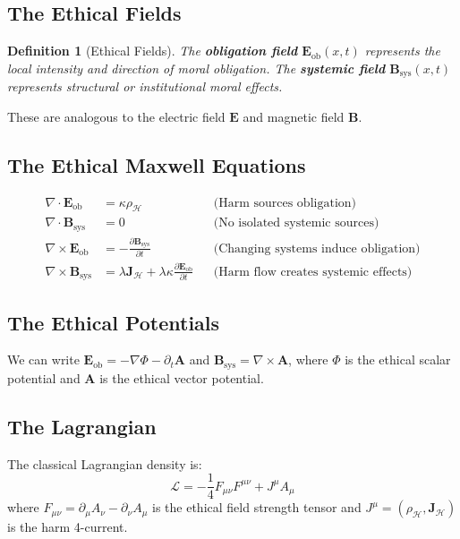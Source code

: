 \documentclass[12pt]{article}
\newtheorem{definition}{Definition}[section]
\begin{document}
\subsection{The Ethical Fields}

\begin{definition}[Ethical Fields]
The \textbf{obligation field} $\mathbf{E}_{\mathrm{ob}}(x,t)$ represents the local intensity and direction of moral obligation. The \textbf{systemic field} $\mathbf{B}_{\mathrm{sys}}(x,t)$ represents structural or institutional moral effects.
\end{definition}

These are analogous to the electric field $\mathbf{E}$ and magnetic field $\mathbf{B}$.

\subsection{The Ethical Maxwell Equations}

\begin{align}
    \nabla \cdot \mathbf{E}_{\mathrm{ob}} &= \kappa \rho_{\mathcal{H}} & &\text{(Harm sources obligation)} \\
    \nabla \cdot \mathbf{B}_{\mathrm{sys}} &= 0 & &\text{(No isolated systemic sources)} \\
    \nabla \times \mathbf{E}_{\mathrm{ob}} &= -\frac{\partial \mathbf{B}_{\mathrm{sys}}}{\partial t} & &\text{(Changing systems induce obligation)} \\
    \nabla \times \mathbf{B}_{\mathrm{sys}} &= \lambda \mathbf{J}_{\mathcal{H}} + \lambda\kappa \frac{\partial \mathbf{E}_{\mathrm{ob}}}{\partial t} & &\text{(Harm flow creates systemic effects)}
\end{align}

\subsection{The Ethical Potentials}

We can write $\mathbf{E}_{\mathrm{ob}} = -\nabla\Phi - \partial_t \mathbf{A}$ and $\mathbf{B}_{\mathrm{sys}} = \nabla \times \mathbf{A}$, where $\Phi$ is the ethical scalar potential and $\mathbf{A}$ is the ethical vector potential.

\subsection{The Lagrangian}

The classical Lagrangian density is:
\begin{equation}
    \mathcal{L} = -\frac{1}{4} F_{\mu\nu} F^{\mu\nu} + J^\mu A_\mu
\end{equation}
where $F_{\mu\nu} = \partial_\mu A_\nu - \partial_\nu A_\mu$ is the ethical field strength tensor and $J^\mu = (\rho_{\mathcal{H}}, \mathbf{J}_{\mathcal{H}})$ is the harm 4-current.
\end{document}
